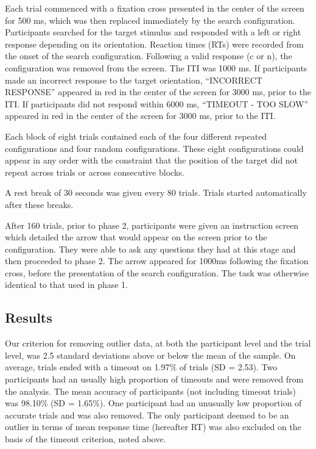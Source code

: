 \documentclass[
  man,
  floatsintext,
  longtable,
  nolmodern,
  notxfonts,
  notimes,
  colorlinks=true,linkcolor=blue,citecolor=blue,urlcolor=blue]{apa7}
\begin{document}
Each trial commenced with a fixation cross presented in the center of
the screen for 500 ms, which was then replaced immediately by the search
configuration. Participants searched for the target stimulus and
responded with a left or right response depending on its orientation.
Reaction times (RTs) were recorded from the onset of the search
configuration. Following a valid response (c or n), the configuration
was removed from the screen. The ITI was 1000 ms. If participants made
an incorrect response to the target orientation, ``INCORRECT RESPONSE''
appeared in red in the center of the screen for 3000 ms, prior to the
ITI. If participants did not respond within 6000 ms, ``TIMEOUT - TOO
SLOW'' appeared in red in the center of the screen for 3000 ms, prior to
the ITI.

Each block of eight trials contained each of the four different repeated
configurations and four random configurations. These eight
configurations could appear in any order with the constraint that the
position of the target did not repeat across trials or across
consecutive blocks.

A rest break of 30 seconds was given every 80 trials. Trials started
automatically after these breaks.

After 160 trials, prior to phase 2, participants were given an
instruction screen which detailed the arrow that would appear on the
screen prior to the configuration. They were able to ask any questions
they had at this stage and then proceeded to phase 2. The arrow appeared
for 1000ms following the fixation cross, before the presentation of the
search configuration. The task was otherwise identical to that used in
phase 1.

\subsection{Results}\label{results}

Our criterion for removing outlier data, at both the participant level
and the trial level, was 2.5 standard deviations above or below the mean
of the sample. On average, trials ended with a timeout on 1.97\% of
trials (SD = 2.53). Two participants had an usually high proportion of
timeouts and were removed from the analysis. The mean accuracy of
participants (not including timeout trials) was 98.10\% (SD = 1.65\%).
One participant had an unusually low proportion of accurate trials and
was also removed. The only participant deemed to be an outlier in terms
of mean response time (hereafter RT) was also excluded on the basis of
the timeout criterion, noted above.
\end{document}
